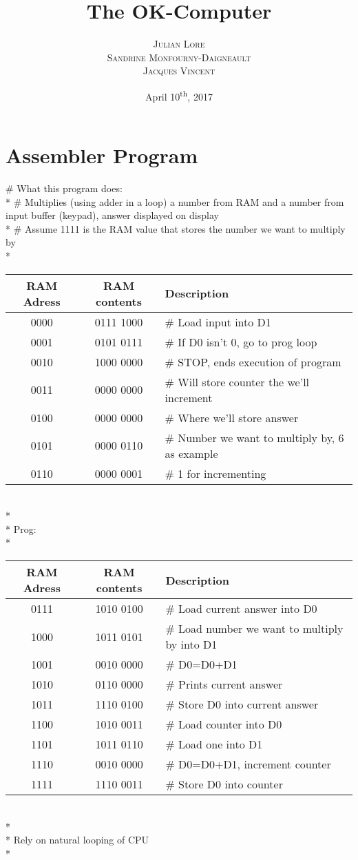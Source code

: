 \documentclass{article}
\title{The OK-Computer}
\date{April 10\textsuperscript{th}, 2017}
\author{
	\textsc{Julian Lore}\\
	\textsc{Sandrine Monfourny-Daigneault}\\
	\textsc{Jacques Vincent}\\
}
\begin{document}
	\maketitle
	\newpage
	\pagestyle{myheadings}
	\section{Assembler Program}
	\# What this program does:
	\\* \# Multiplies (using adder in a loop) a number from RAM and a number from input buffer (keypad), answer displayed on display
	\\* \# Assume 1111 is the RAM value that stores the number we want to multiply by
	\\*
	\begin{tabular}{|c|c|l|}
	\hline RAM Adress & RAM contents & Description
	\\* \hline 	0000	& 0111 1000 & \# Load input into D1
	\\* \hline 	0001	& 0101 0111 & \# If D0 isn't 0, go to prog loop
	\\* \hline 	0010	& 1000 0000 & \# STOP, ends execution of program
	\\* \hline 	0011	& 0000 0000 & \# Will store counter the we'll increment
	\\* \hline 	0100	& 0000 0000 & \# Where we'll store answer
	\\* \hline 	0101	& 0000 0110 & \# Number we want to multiply by, 6 as example
	\\* \hline 	0110	& 0000 0001 & \# 1 for incrementing
	\\ \hline
	\end{tabular}
	\\*
	\\* Prog:
	\\*
	\begin{tabular}{|c|c|l|}
	\hline RAM Adress & RAM contents & Description
	\\* \hline 	0111	& 1010 0100 & \# Load current answer into D0
	\\* \hline 	1000	& 1011 0101 & \# Load number we want to multiply by into D1
	\\* \hline 	1001	& 0010 0000 & \# D0=D0+D1
	\\* \hline 	1010	& 0110 0000 & \# Prints current answer
	\\* \hline 	1011	& 1110 0100 & \# Store D0 into current answer
	\\* \hline 	1100	& 1010 0011 & \# Load counter into D0
	\\* \hline 	1101	& 1011 0110 & \# Load one into D1
	\\* \hline 	1110	& 0010 0000 & \# D0=D0+D1, increment counter
	\\* \hline 	1111	& 1110 0011 & \# Store D0 into counter
	\\ \hline
	\end{tabular}
	\\*
	\\* Rely on natural looping of CPU
	\\*
\end{document}
